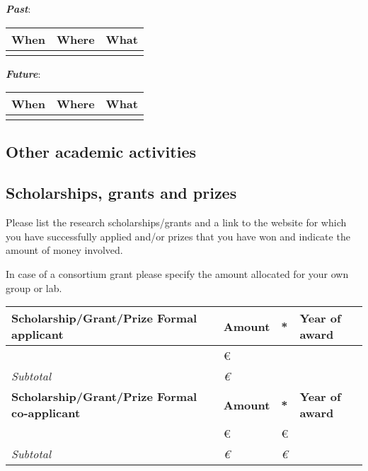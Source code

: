 \noindent\textbf{\textit{Past}}:

\begin{table}[h!]
\begin{tabular}{p{5em}p{5em}p{28em}}
\hline
\T\B\textbf{When}&\textbf{Where}&\textbf{What}\\
\hline

\T&&\\

\hline
\end{tabular}
\end{table}

\noindent\textbf{\textit{Future}}:

\begin{table}[h!]
\begin{tabular}{p{5em}p{5em}p{28em}}
\hline
\T\B\textbf{When}&\textbf{Where}&\textbf{What}\\
\hline

\T&&\\

\hline
\end{tabular}
\end{table}

\subsection{Other academic activities}

\subsection{Scholarships, grants and prizes}
Please list the research scholarships/grants and a link to the website for which
you have successfully applied and/or prizes that you have won and indicate the
amount of money involved.

\noindent*In case of a consortium grant please specify the amount allocated for
your own group or lab.

\begin{table}[h!]

\begin{tabular}{p{26em}p{4em}p{3em}p{4em}}
\hline

\T\B\textbf{Scholarship/Grant/Prize Formal
applicant}&\textbf{Amount}&\textbf{*}&\textbf{Year of award}\\

\hline

\T\B &\euro & &\\

\T\B\textit{Subtotal}&\emph{\euro }&&\\

\hline

\T\B\textbf{Scholarship/Grant/Prize Formal
co-applicant}&\textbf{Amount}&\textbf{*}&\textbf{Year of award}\\

\hline

\T \B & \euro & \euro & \\

\T\B\textit{Subtotal}&\emph{\euro }& \emph{\euro } & \\

\hline
\end{tabular}
\end{table}

